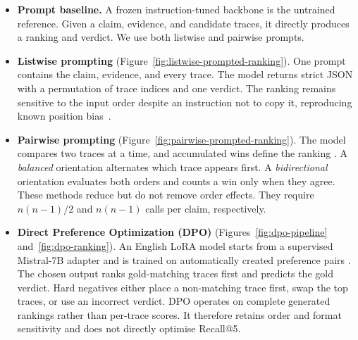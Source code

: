 \begin{itemize}
\item \textbf{Prompt baseline.} A frozen instruction-tuned backbone is the untrained reference. Given
a claim, evidence, and candidate traces, it directly produces a ranking and verdict. We use both
listwise and pairwise prompts.

\item \textbf{Listwise prompting} (Figure~\ref{fig:listwise-prompted-ranking}). One prompt contains
the claim, evidence, and every trace. The model returns strict JSON with a permutation of trace
indices and one verdict. The ranking remains sensitive to the input order despite an instruction not
to copy it, reproducing known position
bias~\cite{qiao2026llmbasedlistwisererankingeffect,shi2025judgingjudgessystematicstudy}.

\item \textbf{Pairwise prompting} (Figure~\ref{fig:pairwise-prompted-ranking}). The model compares two
traces at a time, and accumulated wins define the ranking
\cite{qin2024largelanguagemodelseffective}. A \emph{balanced} orientation alternates which trace
appears first. A \emph{bidirectional} orientation evaluates both orders and counts a win only when
they agree. These methods reduce but do not remove order effects. They require $n(n-1)/2$ and
$n(n-1)$ calls per claim, respectively.

\item \textbf{Direct Preference Optimization (DPO)} (Figures~\ref{fig:dpo-pipeline}
and~\ref{fig:dpo-ranking}). An English LoRA model starts from a supervised Mistral-7B adapter and is
trained on automatically created preference pairs
\cite{rafailov2024directpreferenceoptimizationlanguage}. The chosen output ranks gold-matching traces
first and predicts the gold verdict. Hard negatives either place a non-matching trace first, swap the
top traces, or use an incorrect verdict. DPO operates on complete generated rankings rather than
per-trace scores. It therefore retains order and format sensitivity and does not directly optimise
Recall@5.
\end{itemize}


